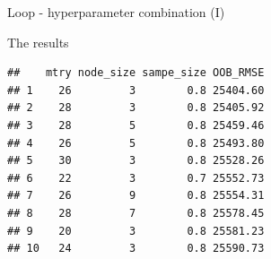 \documentclass[
  10pt,
  ignorenonframetext,
]{beamer}
\newenvironment{Shaded}{}{}
\newcommand{\CommentTok}[1]{\textcolor[rgb]{0.00,0.50,0.00}{#1}}
\newcommand{\ControlFlowTok}[1]{\textcolor[rgb]{0.00,0.00,1.00}{#1}}
\newcommand{\DataTypeTok}[1]{#1}
\newcommand{\DecValTok}[1]{#1}
\newcommand{\KeywordTok}[1]{\textcolor[rgb]{0.00,0.00,1.00}{#1}}
\newcommand{\NormalTok}[1]{#1}
\newcommand{\OperatorTok}[1]{#1}
\newcommand{\StringTok}[1]{\textcolor[rgb]{0.00,0.50,0.50}{#1}}
\begin{document}
\begin{frame}[fragile]{Loop - hyperparameter combination (I)}
\protect\hypertarget{loop---hyperparameter-combination-i}{}

\begin{Shaded}
\end{Shaded}

\end{frame}

\begin{frame}[fragile]{The results}
\protect\hypertarget{the-results}{}

\begin{Shaded}
\end{Shaded}

\begin{verbatim}
##    mtry node_size sampe_size OOB_RMSE
## 1    26         3        0.8 25404.60
## 2    28         3        0.8 25405.92
## 3    28         5        0.8 25459.46
## 4    26         5        0.8 25493.80
## 5    30         3        0.8 25528.26
## 6    22         3        0.7 25552.73
## 7    26         9        0.8 25554.31
## 8    28         7        0.8 25578.45
## 9    20         3        0.8 25581.23
## 10   24         3        0.8 25590.73
\end{verbatim}

\end{frame}
\end{document}
